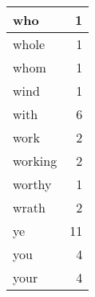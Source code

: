 \begin{center}
\begin{longtable}{l|r}
who & 1\\ \hline 
whole & 1\\ \hline 
whom & 1\\ \hline 
wind & 1\\ \hline 
with & 6\\ \hline 
work & 2\\ \hline 
working & 2\\ \hline 
worthy & 1\\ \hline 
wrath & 2\\ \hline 
ye & 11\\ \hline 
you & 4\\ \hline 
your & 4\\ \hline 
\end{longtable}  
\end{center}  


  
\normalsize  

  
  
